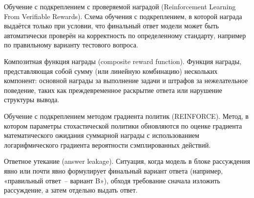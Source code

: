 \begin{definition}
    \label{def:rlvr}
    Обучение с подкреплением с проверяемой наградой 
    (Reinforcement Learning From Verifiable Rewards). 
    Схема обучения с подкреплением, в которой награда выдаётся только при условии, 
    что финальный ответ модели может быть автоматически проверён на корректность 
    по определенному стандарту, например по правильному варианту тестового вопроса.
\end{definition}

\begin{definition}
    \label{def:compreward}
    Композитная функция награды (composite reward function). 
    Функция награды, представляющая собой сумму (или линейную комбинацию) 
    нескольких компонент: основной награды за выполнение задачи и штрафов за 
    нежелательное поведение, таких как преждевременное раскрытие ответа или 
    нарушение структуры вывода.
\end{definition}

\begin{definition}
    \label{def:reinforce}
    Обучение с подкреплением методом градиента политик (REINFORCE). 
    Метод, в котором параметры стохастической политики обновляются по оценке 
    градиента математического ожидания суммарной награды с использованием 
    логарифмического градиента вероятности сэмплированных действий.
\end{definition}

\begin{definition}
    \label{def:leakage}
    Ответное утекание (answer leakage). 
    Ситуация, когда модель в блоке рассуждения явно или почти явно формулирует 
    финальный вариант ответа (например, «правильный ответ~-- вариант B»), 
    обходя требование сначала изложить рассуждение, а затем отдельно выдать ответ.
\end{definition}


